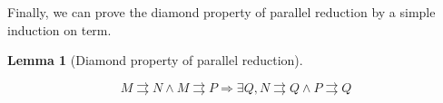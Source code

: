 \documentclass[preprint,10pt]{sigplanconf}
\newcommand{\p}{\ensuremath{\rightrightarrows}}
\newtheorem{lemma}{Lemma}
\begin{document}
Finally, we can prove the diamond property of parallel reduction by a simple induction on term.


    \begin{lemma}[Diamond property of parallel reduction]
    \label{pdiamond}

    \[ M \p N \wedge M \p P \Rightarrow \exists Q, N \p Q \wedge P \p  Q  \]



  \end{lemma}
\end{document}
